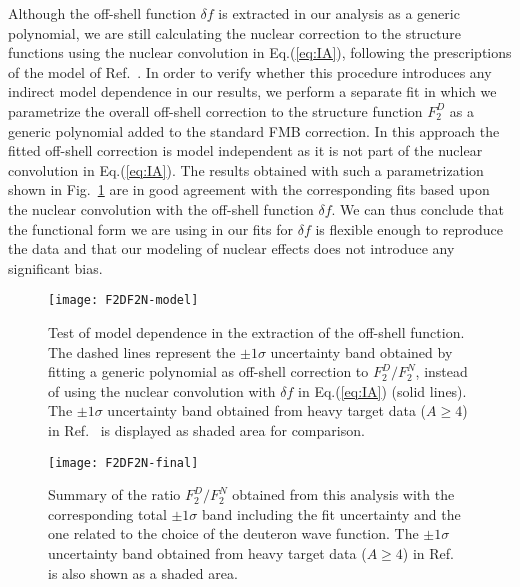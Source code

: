 \documentclass[%
      aps,
      prd,
      floatfix,
      preprintnumbers,
      preprint,
      showpacs,
      nofootinbib,
      tightenlines,
      amssymb,
      amsmath
]{revtex4-1}
\newcommand{\eq}[1]{Eq.(\ref{#1})}
\begin{document}
Although the off-shell function $\delta f$ is extracted in our analysis as a generic 
polynomial, we are still calculating the nuclear correction to the structure functions 
using the nuclear convolution in \eq{eq:IA}, following the prescriptions of 
the model of Ref.~\cite{KP04}. In order to verify whether this procedure introduces 
any indirect model dependence in our results, we perform a separate fit in which we 
parametrize the overall off-shell 
correction to the structure function $F_2^D$ as a generic polynomial added 
to the standard FMB correction. In this approach the fitted off-shell correction 
is model independent as it is not part of the nuclear convolution in \eq{eq:IA}. 
The results obtained with such a parametrization shown in Fig.~\ref{fig:f2d-model} 
are in good agreement with the corresponding fits based upon the 
nuclear convolution with the off-shell function $\delta f$.  
We can thus conclude 
that the functional form we are using in our fits for $\delta f$ is flexible enough to 
reproduce the data and that our modeling of nuclear effects does not introduce any 
significant bias.  


\begin{figure}[tb] %
\begin{center}
\texttt{[image: F2DF2N-model]}
\caption{%
Test of model dependence in the extraction of the off-shell function. The dashed lines represent 
the $\pm 1 \sigma$ uncertainty band obtained by fitting a generic polynomial as off-shell 
correction to $F_2^D/F_2^N$, instead of using the nuclear convolution with $\delta f$ 
in \eq{eq:IA} (solid lines). 
The $\pm 1 \sigma$ uncertainty band obtained from heavy target data ($A \geq 4$) in Ref.~\cite{KP04} is
displayed as shaded area for comparison.
}
\label{fig:f2d-model}
\end{center}
\end{figure}


\begin{figure}[htb] %
\begin{center}
\texttt{[image: F2DF2N-final]}
\caption{%
Summary of the ratio $F_2^D/F_2^N$ obtained from this analysis with the corresponding 
total $\pm 1 \sigma$ band including the fit uncertainty and the one related to the choice of 
the deuteron wave function. 
The $\pm 1 \sigma$ uncertainty band obtained from heavy target data ($A \geq 4$) in Ref.~\cite{KP04} is
also shown as a shaded area.
}
\label{fig:f2d-final}
\end{center}
\end{figure}
\end{document}
